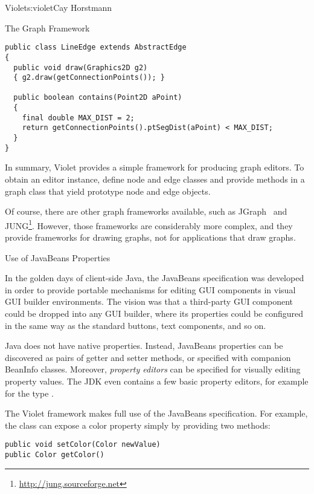 \begin{aosachapter}{Violet}{s:violet}{Cay Horstmann}
\begin{aosasect1}{The Graph Framework}
\begin{verbatim}
public class LineEdge extends AbstractEdge
{
  public void draw(Graphics2D g2)
  { g2.draw(getConnectionPoints()); }

  public boolean contains(Point2D aPoint)
  {
    final double MAX_DIST = 2;
    return getConnectionPoints().ptSegDist(aPoint) < MAX_DIST;
  }
}
\end{verbatim}


In summary, Violet provides a simple framework for producing graph
editors.  To obtain an editor instance, define node and edge classes
and provide methods in a graph class that yield prototype node and
edge objects.

Of course, there are other graph frameworks available, such as
JGraph~\cite{bib:alder:jgraph} and
JUNG\footnote{\url{http://jung.sourceforge.net}}. However, those
frameworks are considerably more complex, and they provide frameworks
for drawing graphs, not for applications that draw graphs.

\end{aosasect1}

\begin{aosasect1}{Use of JavaBeans Properties}

In the golden days of client-side Java, the JavaBeans specification
was developed in order to provide portable mechanisms for editing GUI
components in visual GUI builder environments. The vision was that a
third-party GUI component could be dropped into any GUI builder, where
its properties could be configured in the same way as the standard
buttons, text components, and so on.

Java does not have native properties. Instead, JavaBeans properties
can be discovered as pairs of getter and setter methods, or specified
with companion BeanInfo classes. Moreover, \emph{property editors} can
be specified for visually editing property values. The JDK even
contains a few basic property editors, for example for the type
.

The Violet framework makes full use of the 
JavaBeans specification. For example, the  class can
expose a color property simply by providing two methods:

\begin{verbatim}
public void setColor(Color newValue)
public Color getColor()
\end{verbatim}


\end{aosasect1}
\end{aosachapter}
